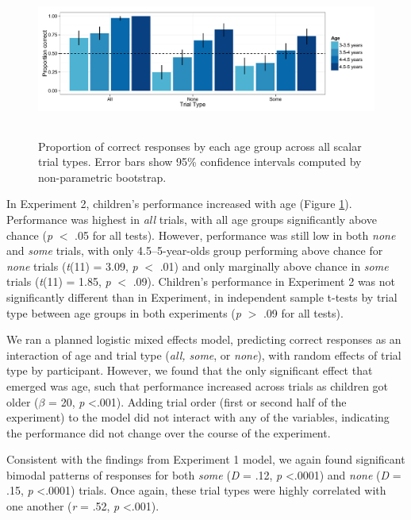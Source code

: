 \documentclass[man]{apa2}
\begin{document}
\begin{figure} 
 \begin{center} 
  \includegraphics[height=2in]{figures/exp2_performance.pdf} 
  \caption{\label{fig:exp2_perf} Proportion of correct responses by each age group across all scalar trial types.  Error bars show 95\% confidence intervals computed by non-parametric bootstrap.} 
 \end{center} 
\end{figure}

In Experiment 2, children's performance increased with age (Figure \ref{fig:exp2_perf}). Performance was highest in \textit{all} trials, with all age groups significantly above chance (\emph{p} $<$ .05 for all tests). However, performance was still low in both \textit{none} and \textit{some} trials, with only 4.5--5-year-olds group performing above chance for \textit{none} trials (\textit{t}(11) = 3.09, \textit{p} $<$ .01) and only marginally above chance in \textit{some} trials (\textit{t}(11) = 1.85, \textit{p} $<$ .09). Children's performance in Experiment 2 was not significantly different than in Experiment, in independent sample t-tests by trial type between age groups in both experiments (\emph{p} $>$ .09 for all tests). 

We ran a planned logistic mixed effects model, predicting correct responses as an interaction of age and trial type (\textit{all, some}, or \textit{none}), with random effects of trial type by participant. However, we found that the only significant effect that emerged was age, such that performance increased across trials as children got older ($\beta$ = 20, \textit{p} \textless  .001). Adding trial order (first or second half of the experiment) to the model did not interact with any of the variables, indicating the performance did not change over the course of the experiment. 

Consistent with the findings from Experiment 1 model, we again found significant bimodal patterns of responses for both \textit{some} (\textit{D} = .12, \textit{p} \textless  .0001) and \textit{none} (\textit{D} = .15, \textit{p} \textless  .0001) trials. Once again, these trial types were highly correlated with one another (\textit{r} = .52, \textit{p} \textless  .001). 
\end{document}
